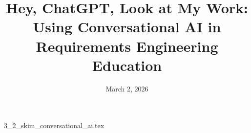 \documentclass{article}      %
\title{Hey, ChatGPT, Look at My Work: Using Conversational AI in Requirements Engineering Education}  %
\date{March 2, 2026}
\begin{document}

\maketitle                   %



{3_2_skim_conversational_ai.tex}
\printbibliography
\end{document}
